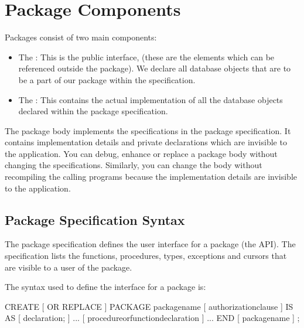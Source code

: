 \documentclass[letterpaper,10pt,english,openany,oneside]{sphinxmanual}
\begin{document}
\newpage


\section{Package Components}
\label{\detokenize{package_components:package-components}}\label{\detokenize{package_components::doc}}
Packages consist of two main components:
\begin{itemize}
\item {} 
The : This is the public interface, (these are
the elements which can be referenced outside the package). We declare
all database objects that are to be a part of our package within the
specification.

\item {} 
The : This contains the actual implementation of all
the database objects declared within the package specification.

\end{itemize}

The package body implements the specifications in the package
specification. It contains implementation details and private
declarations which are invisible to the application. You can debug,
enhance or replace a package body without changing the specifications.
Similarly, you can change the body without recompiling the calling
programs because the implementation details are invisible to the
application.


\subsection{Package Specification Syntax}
\label{\detokenize{package_components:package-specification-syntax}}
The package specification defines the user interface for a package (the
API). The specification lists the functions, procedures, types,
exceptions and cursors that are visible to a user of the package.

The syntax used to define the interface for a package is:

%
\begin{sphinxVerbatim}[commandchars=\\\{\}]
CREATE [ OR REPLACE ] PACKAGE \PYGZlt{}package\PYGZus{}name\PYGZgt{}
[ \PYGZlt{}authorization\PYGZus{}clause\PYGZgt{} ]
\PYGZob{} IS \textbar{} AS \PYGZcb{}
[ \PYGZlt{}declaration\PYGZgt{}; ] ...
[ \PYGZlt{}procedure\PYGZus{}or\PYGZus{}function\PYGZus{}declaration\PYGZgt{} ] ...
END [ \PYGZlt{}package\PYGZus{}name\PYGZgt{} ] ;
\end{sphinxVerbatim}
\end{document}
